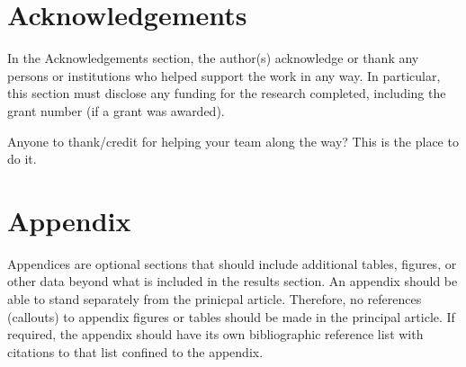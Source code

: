 \documentclass[10pt,twocolumn,letterpaper]{article}
\begin{document}
\section{Acknowledgements}
In the Acknowledgements section, the author(s) acknowledge or thank any persons or institutions who helped support the work in any way. In particular, this section must disclose any funding for the research completed, including the grant number (if a grant was awarded).

Anyone to thank/credit for helping your team along the way? This is the place to do it.

\section{Appendix}
Appendices are optional sections that should include additional tables, figures, or other data beyond what is included in the results section. An appendix should be able to stand separately from the prinicpal article. Therefore, no references (callouts) to appendix figures or tables should be made in the principal article. If required, the appendix should have its own bibliographic reference list with citations to that list confined to the appendix. \cite{latexcompanion}




\end{document}
